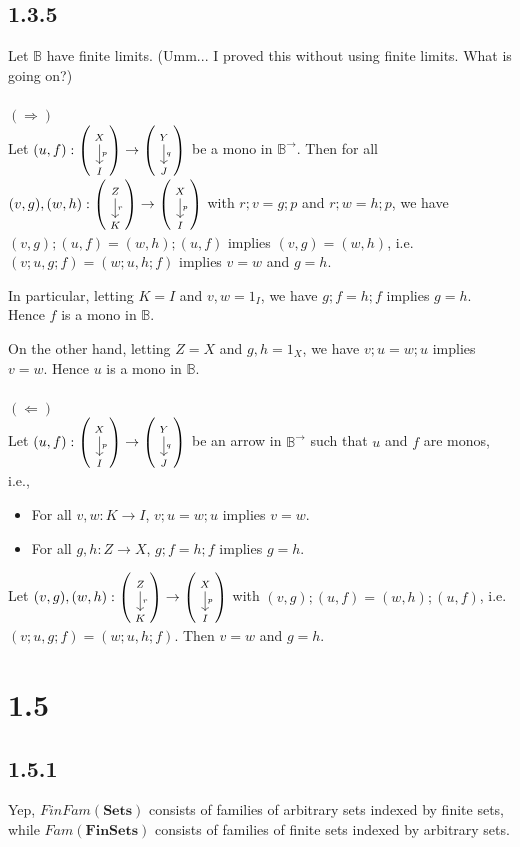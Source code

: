 \documentclass{article}
\newcommand{\mbf}{\mathbf}
\newcommand{\ddisp}[3]{
\left(
\scriptsize
\begin{tikzcd}
#1 \ar[d, "\footnotesize{#2}"] \\
#3
\end{tikzcd}
\normalsize
\right)
}
\begin{document}
\subsection*{1.3.5}

Let $\mathbb B$ have finite limits. (Umm... I proved this without using finite limits. What is going on?)
~\\~\\
$(\Rightarrow)$~\\
Let $(u,f) : \ddisp{X}{p}{I} \to \ddisp{Y}{q}{J}$ be a mono in $\mathbb B^{\to}$. Then for all 
$(v,g),(w,h) : \ddisp{Z}{r}{K} \to \ddisp{X}{p}{I}$ with $r;v = g;p$ and $r;w = h;p$, 
we have $(v,g);(u,f) = (w,h);(u,f)$ implies 
$(v,g) = (w,h)$, i.e. $(v;u, g;f) = (w;u,h;f)$ implies $v = w$ and $g = h$.

In particular, letting $K = I$ and $v,w = 1_I$, we have $g;f = h;f$ implies $g = h$.
Hence $f$ is a mono in $\mathbb B$. 

On the other hand, letting $Z = X$ and $g,h = 1_X$, we have $v;u = w;u$ implies $v = w$.
Hence $u$ is a mono in $\mathbb B$.
~\\~\\
$(\Leftarrow)$~\\
Let $(u,f) : \ddisp{X}{p}{I} \to \ddisp{Y}{q}{J}$ be an arrow in $\mathbb B^{\to}$ %
such that $u$ and $f$ are monos, i.e.,
\begin{itemize}
\item For all $v,w : K \to I$, $v;u = w;u$ implies $v = w$.
\item For all $g,h : Z \to X$, $g;f = h;f$ implies $g = h$.
\end{itemize}
Let $(v,g),(w,h) : \ddisp{Z}{r}{K} \to \ddisp{X}{p}{I}$ %
with $(v,g);(u,f) = (w,h);(u,f)$, i.e. $(v;u,g;f) = (w;u,h;f)$. Then $v = w$ and $g = h$. 




\section*{1.5}

\subsection*{1.5.1}

Yep, $FinFam(\mbf{Sets})$ consists of families of arbitrary sets indexed by finite sets,
while $Fam(\mbf{FinSets})$ consists of families of finite sets indexed by arbitrary sets.
\end{document}
